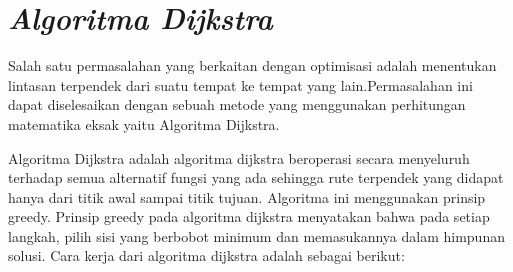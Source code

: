 \section{\textit{Algoritma Dijkstra}}
Salah satu permasalahan yang berkaitan dengan optimisasi adalah menentukan lintasan terpendek dari suatu tempat ke tempat yang lain.Permasalahan ini dapat diselesaikan dengan sebuah metode yang menggunakan perhitungan matematika eksak yaitu Algoritma Dijkstra.

Algoritma Dijkstra adalah algoritma dijkstra beroperasi secara menyeluruh terhadap semua alternatif fungsi yang ada sehingga rute terpendek yang didapat hanya dari titik awal sampai titik tujuan. Algoritma ini menggunakan prinsip greedy. Prinsip greedy pada algoritma dijkstra menyatakan bahwa pada setiap langkah,  pilih sisi yang berbobot minimum dan memasukannya dalam himpunan solusi. Cara kerja dari algoritma dijkstra adalah sebagai berikut:

